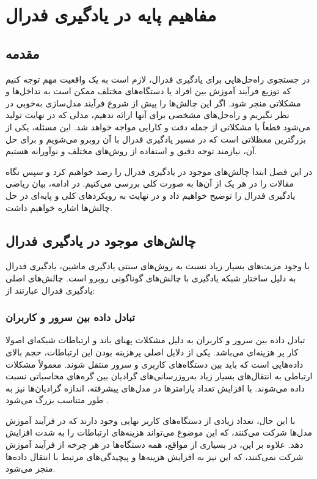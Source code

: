 \chapter{مفاهیم پایه در یادگیری فدرال}

\section{مقدمه}
در جستجوی راه‌حل‌هایی برای یادگیری فدرال، لازم است به یک واقعیت مهم توجه کنیم که توزیع فرآیند آموزش بین افراد یا دستگاه‌های مختلف ممکن است به تداخل‌ها و مشکلاتی منجر شود. اگر این چالش‌ها را پیش از شروع فرآیند مدل‌سازی به‌خوبی در نظر نگیریم و راه‌حل‌های مشخصی برای آنها ارائه ندهیم، مدلی که در نهایت تولید می‌شود قطعاً با مشکلاتی از جمله دقت و کارایی مواجه خواهد شد. این مسئله، یکی از بزرگترین معظلاتی است که در مسیر یادگیری فدرال با آن روبرو می‌شویم و برای حل آن، نیازمند توجه دقیق و استفاده از روش‌های مختلف و نوآورانه هستیم.

در این فصل ابتدا چالش‌های موجود در یادگیری فدرال را رصد خواهیم کرد و سپس نگاه مقالات را در هر یک از آن‌ها به صورت کلی بررسی می‌کنیم. در ادامه، بیان ریاضی یادگیری فدرال را توضیح خواهیم داد و در نهایت به رویکردهای کلی و پایه‌ای در حل چالش‌ها اشاره خواهیم داشت.

\section{چالش‌های موجود در یادگیری فدرال}
با وجود مزیت‌های بسیار زیاد نسبت به روش‌های سنتی یادگیری ماشین، یادگیری فدرال به دلیل ساختار شبکه یادگیری با چالش‌های گوناگونی روبرو است. چالش‌های اصلی یادگیری فدرال عبارتند از:


\subsection{تبادل داده بین سرور و کاربران}
تبادل داده بین سرور و کاربران به دلیل مشکلات پهنای باند و ارتباطات شبکه‌ای اصولا کار پر هزینه‌ای می‌باشد. یکی از دلایل اصلی پرهزینه بودن این ارتباطات، حجم بالای داده‌هایی است که باید بین دستگاه‌های کاربری و سرور منتقل شوند.
معمولاً مشکلات ارتباطی به انتقال‌های بسیار زیاد به‌روزرسانی‌های گرادیان بین گره‌های محاسباتی نسبت داده می‌شوند. با افزایش تعداد پارامترها در مدل‌های پیشرفته، اندازه گرادیان‌ها نیز به طور متناسب بزرگ می‌شود
\cite{wang2018atomo}.

با این حال، تعداد زیادی از دستگاه‌های کاربر نهایی وجود دارند که در فرآیند آموزش مدل‌ها شرکت می‌کنند، که این موضوع می‌تواند هزینه‌های ارتباطات را به شدت افزایش دهد. علاوه بر این، در بسیاری از مواقع، همه دستگاه‌ها در هر چرخه از فرآیند آموزش شرکت نمی‌کنند، که این نیز به افزایش هزینه‌ها و پیچیدگی‌های مرتبط با انتقال داده‌ها منجر می‌شود.



